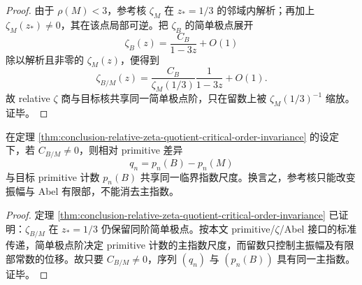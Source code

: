 \begin{proof}
由于 \(\rho(M)<3\)，参考核 \(\zeta_M\) 在 \(z_\ast=1/3\) 的邻域内解析；再加上 \(\zeta_M(z_\ast)\neq 0\)，其在该点局部可逆。把 \(\zeta_B\) 的简单极点展开
\[
\zeta_B(z)=\frac{C_B}{1-3z}+O(1)
\]
除以解析且非零的 \(\zeta_M(z)\)，便得到
\[
\zeta_{B/M}(z)=\frac{C_B}{\zeta_M(1/3)}\frac{1}{1-3z}+O(1).
\]
故 relative \(\zeta\) 商与目标核共享同一简单极点阶，只在留数上被 \(\zeta_M(1/3)^{-1}\) 缩放。证毕。
\end{proof}

\begin{corollary}[参考减法无法抹除本原相的主指数]\label{cor:conclusion-relative-primitive-subtraction-preserves-main-exponent}
在定理 \ref{thm:conclusion-relative-zeta-quotient-critical-order-invariance} 的设定下，若 \(C_{B/M}\neq 0\)，则相对 primitive 差异
\[
q_n=p_n(B)-p_n(M)
\]
与目标 primitive 计数 \(p_n(B)\) 共享同一临界指数尺度。换言之，参考核只能改变振幅与 Abel 有限部，不能消去主指数。
\end{corollary}

\begin{proof}
定理 \ref{thm:conclusion-relative-zeta-quotient-critical-order-invariance} 已证明：\(\zeta_{B/M}\) 在 \(z_\ast=1/3\) 仍保留同阶简单极点。按本文 primitive/\(\zeta\)/Abel 接口的标准传递，简单极点阶决定 primitive 计数的主指数尺度，而留数只控制主振幅及有限部常数的位移。故只要 \(C_{B/M}\neq 0\)，序列 \((q_n)\) 与 \((p_n(B))\) 具有同一主指数。证毕。
\end{proof}



\endinput

